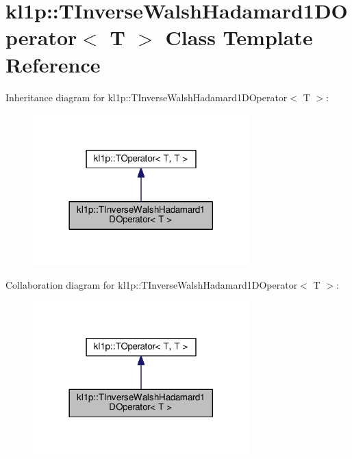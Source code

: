 \hypertarget{classkl1p_1_1TInverseWalshHadamard1DOperator}{}\section{kl1p\+:\+:T\+Inverse\+Walsh\+Hadamard1\+D\+Operator$<$ T $>$ Class Template Reference}
\label{classkl1p_1_1TInverseWalshHadamard1DOperator}


Inheritance diagram for kl1p\+:\+:T\+Inverse\+Walsh\+Hadamard1\+D\+Operator$<$ T $>$\+:
\nopagebreak
\begin{figure}[H]
\begin{center}
\leavevmode
\includegraphics[width=237pt]{classkl1p_1_1TInverseWalshHadamard1DOperator__inherit__graph}
\end{center}
\end{figure}


Collaboration diagram for kl1p\+:\+:T\+Inverse\+Walsh\+Hadamard1\+D\+Operator$<$ T $>$\+:
\nopagebreak
\begin{figure}[H]
\begin{center}
\leavevmode
\includegraphics[width=237pt]{classkl1p_1_1TInverseWalshHadamard1DOperator__coll__graph}
\end{center}
\end{figure}

